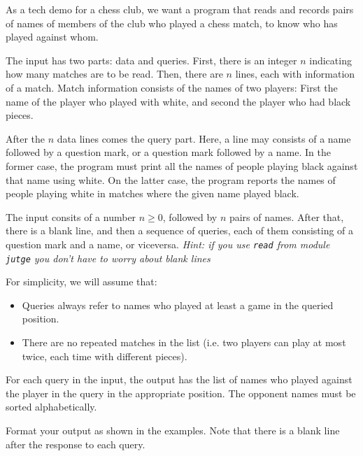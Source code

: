 
\UsePython

\Statement
As a tech demo for a chess club, we want a program that reads and records pairs of names of members of the club who played a chess match, to know who has played against whom.

The input has two parts: data and queries. First, there is an integer $n$ indicating how many matches are to be read.
Then, there are $n$ lines, each with information of a match. Match information consists of the names of two players: First the name of the player who played with white, and second the player who had black pieces.

After the $n$ data lines comes the query part. Here, a line may consists of a name followed by a question mark, or a question mark followed by a name. In the former case, the program must print all the names of people playing black against that name using white. On the latter case, the program reports the names of people playing white in matches where the given name played black.

\Input
The input consits of a number $n\ge{0}$, followed by $n$ pairs of names.
After that, there is a blank line, and then a sequence of queries, each of them consisting of a question mark and a name, or viceversa.
\textit{Hint: if you use \texttt{read} from module \texttt{jutge} you don't have to worry about blank lines}

For simplicity, we will assume that:
\begin{itemize}
\item Queries always refer to names who played at least a game in the queried position.
\item There are no repeated matches in the list (i.e. two players can play at most twice, each time with different pieces).
\end{itemize}

\Output
For each query in the input, the output has the list of names who played against the player in the query in the appropriate position. The opponent names must be sorted alphabetically. 

Format your output as shown in the examples. Note that there is a blank line after the response to each query.

